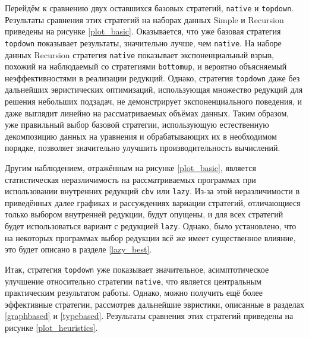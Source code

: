 \documentclass[../thesis.tex]{subfiles}
\begin{document}
Перейдём к сравнению двух оставшихся базовых стратегий, \texttt{native} и \texttt{topdown}. Результаты сравнения этих стратегий на наборах данных Simple и Recursion приведены на рисунке \ref{plot_basic}. Оказывается, что уже базовая стратегия \texttt{topdown} показывает результаты, значительно лучше, чем \texttt{native}. На наборе данных Recursion стратегия \texttt{native} показывает экспоненциальный взрыв, похожий на наблюдаемый со стратегиями \texttt{bottomup}, и вероятно объясняемый неэффективностями в реализации редукций. Однако, стратегия \texttt{topdown} даже без дальнейших эвристических оптимизаций, использующая множество редукций для решения небольших подзадач, не демонстрирует экспоненциального поведения, и даже выглядит линейно на рассматриваемых объёмах данных. Таким образом, уже правильный выбор базовой стратегии, использующую естественную декомпозицию данных на уравнения и обрабатывающих их в необходимом порядке, позволяет значительно улучшить производительность вычислений.

Другим наблюдением, отражённым на рисунке \ref{plot_basic}, является статистическая неразличимость на рассматриваемых программах при использовании внутренних редукций \texttt{cbv} или \texttt{lazy}. Из-за этой неразличимости в приведённых далее графиках и рассуждениях вариации стратегий, отличающиеся только выбором внутренней редукции, будут опущены, и для всех стратегий будет использоваться вариант с редукцией \texttt{lazy}. Однако, было установлено, что на некоторых программах выбор редукции всё же имеет существенное влияние, это будет описано в разделе \ref{lazy_best}.

Итак, стратегия \texttt{topdown} уже показывает значительное, асимптотическое улучшение относительно стратегии \texttt{native}, что является центральным практическим результатом работы. Однако, можно получить ещё более эффективные стратегии, рассмотрев дальнейшие эвристики, описанные в разделах \ref{graphbased} и \ref{typebased}. Результаты сравнения этих стратегий приведены на рисунке \ref{plot_heuristics}.
\end{document}
